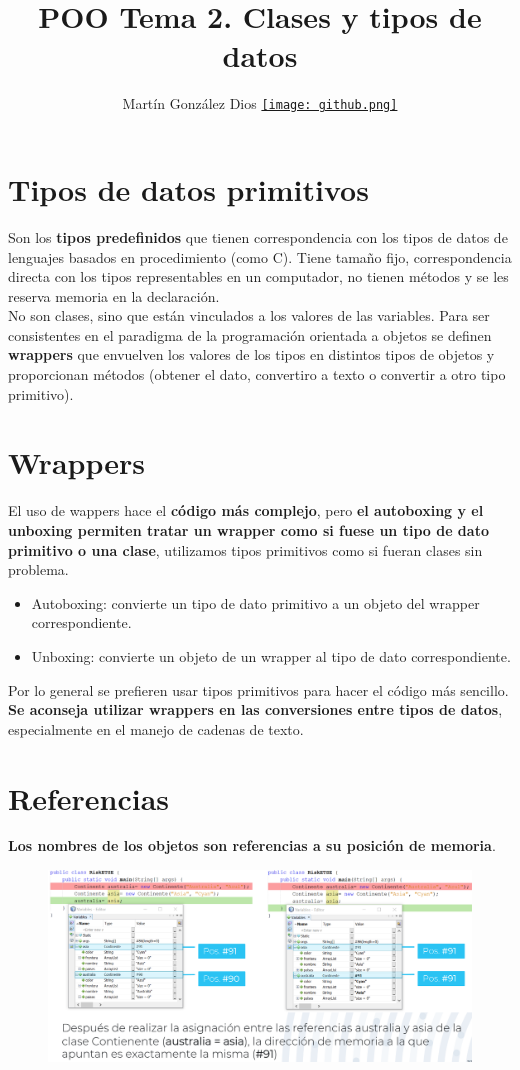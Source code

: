 \documentclass{article}
\title{POO Tema 2. Clases y tipos de datos}
\author{Martín González Dios 
\href{https://github.com/martindios}{\texttt{[image: github.png]}}}
\begin{document}
\maketitle

\section{Tipos de datos primitivos}
Son los \textbf{tipos predefinidos} que tienen correspondencia con los tipos de datos de lenguajes basados en procedimiento (como C). Tiene tamaño fijo, correspondencia directa con los tipos representables en un computador, no tienen métodos y se les reserva memoria en la declaración. \\ 
No son clases, sino que están vinculados a los valores de las variables. Para ser consistentes en el paradigma de la programación orientada a objetos se definen \textbf{wrappers} que envuelven los valores de los tipos en distintos tipos de objetos y proporcionan métodos (obtener el dato, convertiro a texto o convertir a otro tipo primitivo).

\section{Wrappers}
El uso de wappers hace el \textbf{código más complejo}, pero \textbf{el autoboxing y el unboxing permiten tratar un wrapper como si fuese un tipo de dato primitivo o una clase}, utilizamos tipos primitivos como si fueran clases sin problema. 
\begin{itemize}
    \item Autoboxing: convierte un tipo de dato primitivo a un objeto del wrapper correspondiente.
    \item Unboxing: convierte un objeto de un wrapper al tipo de dato correspondiente.
\end{itemize}

Por lo general se prefieren usar tipos primitivos para hacer el código más sencillo. \textbf{Se aconseja utilizar wrappers en las conversiones entre tipos de datos}, especialmente en el manejo de cadenas de texto.

\newpage

\section{Referencias}
\textbf{Los nombres de los objetos son referencias a su posición de memoria}.

\begin{figure}[h]
    \centering
    \includegraphics[width=\textwidth]{img-t2/img_279_25.png}
\end{figure}
\end{document}
